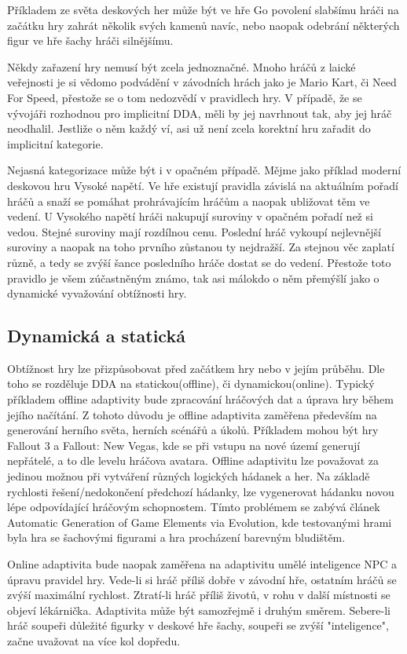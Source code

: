 Příkladem ze světa deskových her může být ve hře Go povolení slabšímu hráči na začátku hry zahrát několik svých kamenů navíc, nebo naopak odebrání některých figur ve hře šachy hráči silnějšímu.

Někdy zařazení hry nemusí být zcela jednoznačné. Mnoho hráčů z laické veřejnosti je si vědomo podvádění v závodních hrách jako je Mario Kart, či Need For Speed, přestože se o tom nedozvědí v pravidlech hry. V případě, že se vývojáři rozhodnou pro implicitní DDA, měli by jej navrhnout tak, aby jej hráč neodhalil. Jestliže o něm každý ví, asi už není zcela korektní hru zařadit do implicitní kategorie.

Nejasná kategorizace může být i v opačném případě. Mějme jako příklad moderní deskovou hru Vysoké napětí. Ve hře existují pravidla závislá na aktuálním pořadí hráčů a snaží se pomáhat prohrávajícím hráčům a naopak ubližovat těm ve vedení. U Vysokého napětí hráči nakupují suroviny v opačném pořadí než si vedou. Stejné suroviny mají rozdílnou cenu. Poslední hráč vykoupí nejlevnější suroviny a naopak na toho prvního zůstanou ty nejdražší. Za stejnou věc zaplatí různě, a tedy se zvýší šance posledního hráče dostat se do vedení. Přestože toto pravidlo je všem zúčastněným známo, tak asi málokdo o něm přemýšlí jako o dynamické vyvažování obtížnosti hry.

\subsection{Dynamická a statická}

Obtížnost hry lze přizpůsobovat před začátkem hry nebo v jejím průběhu. Dle toho se rozděluje DDA na statickou(offline), či dynamickou(online). Typický příkladem offline adaptivity bude zpracování hráčových dat a úprava hry během jejího načítání. Z tohoto důvodu je offline adaptivita zaměřena především na generování herního světa, herních scénářů a úkolů\cite{16Survey}. Příkladem mohou být hry Fallout 3 a Fallout: New Vegas, kde se při vstupu na nové území generují nepřátelé, a to dle levelu hráčova avatara. Offline adaptivitu lze považovat za jedinou možnou při vytváření různých logických hádanek a her. Na základě rychlosti řešení/nedokončení předchozí hádanky, lze vygenerovat hádanku novou lépe odpovídající hráčovým schopnostem. Tímto problémem se zabývá článek Automatic Generation of Game Elements via Evolution\cite{17Evol}, kde testovanými hrami byla hra se šachovými figurami a hra procházení barevným bludištěm.

Online adaptivita bude naopak zaměřena na adaptivitu umělé inteligence NPC a úpravu pravidel hry. Vede-li si hráč příliš dobře v závodní hře, ostatním hráčů se zvýší maximální rychlost. Ztratí-li hráč příliš životů, v rohu v další místnosti se objeví lékárnička. Adaptivita může být samozřejmě i druhým směrem. Sebere-li hráč soupeři důležité figurky v deskové hře šachy, soupeři se zvýší "inteligence", začne uvažovat na více kol dopředu. 

